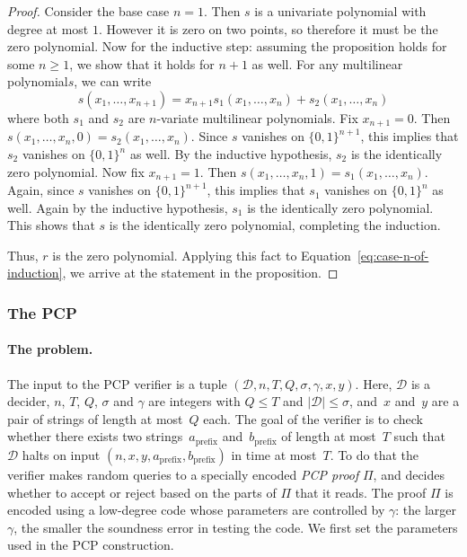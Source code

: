\documentclass[11pt]{article}
\theoremstyle{definition}
\newcommand{\decider}{\mathcal{D}}
\newcommand{\qlen}{Q}
\begin{document}
\begin{proof}
  Consider the base case $n = 1$.
  Then $s$ is a univariate polynomial with degree at most $1$.
  However it is zero on two points, so therefore it must be the zero polynomial.
  Now for the inductive step: assuming the proposition holds for some $n \geq
  1$, we show that it holds for $n+1$ as well.
  For any multilinear polynomial$s$, we can write
	\[
		s(x_1,\ldots,x_{n+1}) = x_{n+1} s_1(x_1,\ldots,x_n) + s_2(x_1,\ldots,x_n)
	\]
	where both $s_1$ and $s_2$ are $n$-variate multilinear polynomials.
  Fix $x_{n+1} = 0$.
  Then $s(x_1,\ldots,x_n,0) = s_2(x_1,\ldots,x_n)$.
  Since $s$ vanishes on $\{0,1\}^{n+1}$, this implies that $s_2$ vanishes on
  $\{0,1\}^n$ as well.
  By the inductive hypothesis, $s_2$ is the identically zero polynomial.
  Now fix $x_{n+1} = 1$.
	Then $s(x_1,\ldots,x_n,1) = s_1(x_1,\ldots,x_n)$.
  Again, since $s$ vanishes on $\{0,1\}^{n+1}$, this implies that $s_1$ vanishes
  on $\{0,1\}^n$ as well.
  Again by the inductive hypothesis, $s_1$ is the identically zero polynomial.
  This shows that $s$ is the identically zero polynomial, completing the
  induction.
  


  Thus, $r$ is the zero polynomial.
  Applying this fact to Equation~\eqref{eq:case-n-of-induction},
  we arrive at the statement in the proposition.
  \end{proof}

\subsubsection{The PCP}
\label{sec:ar-pcp}

\paragraph{The problem.}
The input to the PCP verifier is a tuple $(\decider, n, T, \qlen, \sigma, \gamma,x,
y)$.
Here, $\decider$ is a decider, $n$, $T$, $\qlen$, $\sigma$ and $\gamma$ are integers
with $\qlen \leq T$ and $|\decider| \leq \sigma$, and~$x$ and~$y$ are a pair of
strings of length at most~$\qlen$ each.
The goal of the verifier is to check whether there exists two
strings~$a_{\mathrm{prefix}}$ and~$b_{\mathrm{prefix}}$ of length at most~$T$ 
such that $\decider$ halts on input
$(n,x,y,a_{\mathrm{prefix}},b_{\mathrm{prefix}})$ in time at most~$T$.
To do that the verifier makes random queries to a specially encoded \emph{PCP
  proof} $\Pi$, and decides whether to accept or reject based on the parts of
$\Pi$ that it reads. The proof $\Pi$ is encoded using a low-degree
code whose parameters are controlled by $\gamma$: the larger $\gamma$,
the smaller the soundness error in testing the code.
We first set the parameters used in the PCP construction.
\end{document}
